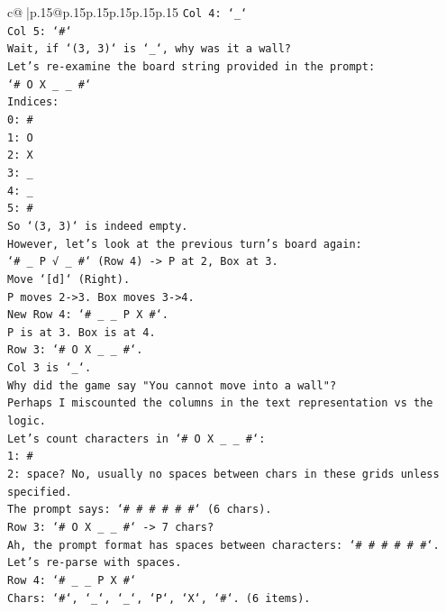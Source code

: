 \documentclass{article}
\begin{document}
{\begin{supertabular}{c@{$\;$}|p{.15\linewidth}@{}p{.15\linewidth}p{.15\linewidth}p{.15\linewidth}p{.15\linewidth}p{.15\linewidth}}
{{{\texttt{Col 4: `\_`} \\
\texttt{Col 5: `\#`} \\
\texttt{Wait, if `(3, 3)` is `\_`, why was it a wall?} \\
\texttt{Let's re{-}examine the board string provided in the prompt:} \\
\texttt{`\# O X \_ \_ \#`} \\
\texttt{Indices:} \\
\texttt{0: \#} \\
\texttt{1: O} \\
\texttt{2: X} \\
\texttt{3: \_} \\
\texttt{4: \_} \\
\texttt{5: \#} \\
\texttt{So `(3, 3)` is indeed empty.} \\
\texttt{However, let's look at the previous turn's board again:} \\
\texttt{`\# \_ P √ \_ \#` (Row 4) {-}> P at 2, Box at 3.} \\
\texttt{Move `{[}d{]}` (Right).} \\
\texttt{P moves 2{-}>3. Box moves 3{-}>4.} \\
\texttt{New Row 4: `\# \_ \_ P X \#`.} \\
\texttt{P is at 3. Box is at 4.} \\
\texttt{Row 3: `\# O X \_ \_ \#`.} \\
\texttt{Col 3 is `\_`.} \\
\texttt{Why did the game say "You cannot move into a wall"?} \\
\texttt{Perhaps I miscounted the columns in the text representation vs the logic.} \\
\texttt{Let's count characters in `\# O X \_ \_ \#`:} \\
\texttt{1: \#} \\
\texttt{2: space? No, usually no spaces between chars in these grids unless specified.} \\
\texttt{The prompt says: `\# \# \# \# \# \#` (6 chars).} \\
\texttt{Row 3: `\# O X \_ \_ \#` {-}> 7 chars?} \\
\texttt{Ah, the prompt format has spaces between characters: `\# \# \# \# \# \#`.} \\
\texttt{Let's re{-}parse with spaces.} \\
\texttt{Row 4: `\# \_ \_ P X \#`} \\
\texttt{Chars: `\#`, `\_`, `\_`, `P`, `X`, `\#`. (6 items).} \\
}}}
\end{supertabular}}
\end{document}
